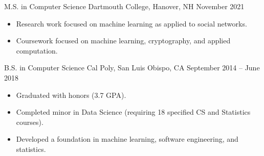 \vspace{2.0mm}  %
\sffamily




\datedentry
    {M.S. in Computer Science}
    {Dartmouth College, Hanover, NH}
    {November 2021}
    {}
\begin{itemize}
    \setlength{\itemindent}{-0.8em}
    \item Research work focused on machine learning as applied to social networks.
    \item Coursework focused on machine learning, cryptography, and applied computation.
\end{itemize}
\divider

\datedentry
    {B.S. in Computer Science}
    {Cal Poly, San Luis Obispo, CA}
    {September 2014 -- June 2018}
    {}

\begin{itemize}
    \setlength{\itemindent}{-0.8em}
    \item Graduated with honors (3.7 GPA).
    \item Completed minor in Data Science (requiring 18 specified CS and Statistics courses).
    \item Developed a foundation in machine learning, software engineering, and statistics.
\end{itemize}

\medskip




\medskip


\smallskip
\centering
